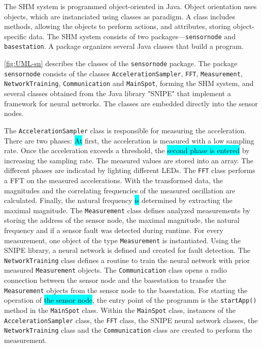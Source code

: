 \documentclass[12pt,a4paper]{scrartcl}
\begin{document}
The SHM system is programmed object-oriented in Java. 
Object orientation uses objects, which are instanciated using classes as paradigm. 
A class includes methods, allowing the objects to perform actions, and attributes, storing object-specific data.
The SHM system consists of two packages---\texttt{sensornode} and \texttt{basestation}.
A package organizes several Java classes that build a program.

\autoref{fig:UML-sn} describes the classes of the \texttt{sensor\-node} package.
The package \texttt{sensor\-node} consists of the classes \texttt{Acceleration\-Sampler}, \texttt{FFT}, \texttt{Measure\-ment}, \texttt{Network\-Training}, \texttt{Communi\-cation} and \texttt{Main\-Spot}, forming the SHM system, and several classes obtained from the Java library "SNIPE" \citep{SNIPE} that implement a framework for neural networks.
The classes are embedded directly into the sensor nodes.

The \texttt{Acceleration\-Sampler} class is responsible for measuring the acceleration.
There are two phases: \colorbox{cyan}{At} first, the acceleration is measured with a low sampling rate.
Once the acceleration exceeds a threshold, the \colorbox{cyan}{second phase is entered} by increasing the sampling rate. 
The measured values are stored into an array.
The different phases are indicatad by lighting different LEDs.
The \texttt{FFT} class performs a FFT on the measured accelerations. 
With the transformed data, the magnitudes and the correlating frequencies of the measured oscillation are calculated.
Finally, the natural frequency \colorbox{cyan}{is} determined by extracting the maximal magnitude.
The \texttt{Measure\-ment} class defines analyzed measurements by storing the address of the sensor node, the maximal magnitude, the natural frequency and if a sensor fault was detected during runtime.
For every measurement, one object of the type \texttt{Measure\-ment} is instantiated.
Using the SNIPE library, a neural network is defined and created for fault detection.
The \texttt{Network\-Training} class defines a routine to train the neural network with prior measured \texttt{Measure\-ment} objects.
The \texttt{Communi\-cation} class opens a radio connection between the sensor node and the basestation to transfer the \texttt{Measure\-ment} objects from the sensor node to the basestation.
For starting the operation of \colorbox{cyan}{the sensor node}, the entry point of the programm is the \texttt{start\-App()} method in the \texttt{Main\-Spot} class. 
Within the \texttt{Main\-Spot} class, instances of the \texttt{Acceleration\-Sampler} class, the \texttt{FFT} class, the SNIPE neural network classes, the \texttt{Network\-Training} class and the \texttt{Communi\-cation} class are created to perform the measurement.
\end{document}
